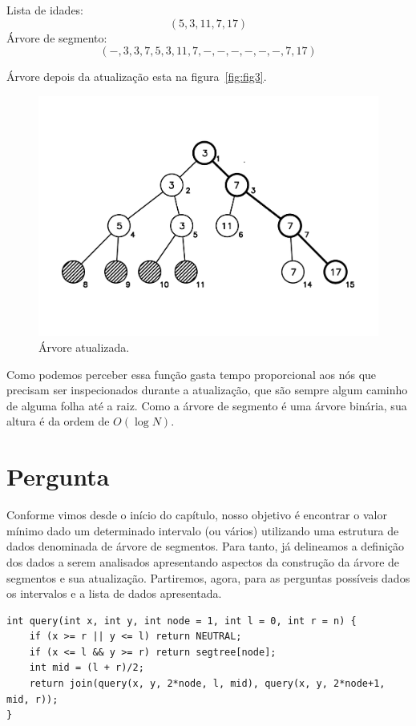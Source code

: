 Lista de idades: $$(5, 3, 11, 7, 17)$$
Árvore de segmento: $$(-, 3, 3, 7, 5, 3, 11, 7, -, -, -, -, -, -, 7, 17)$$

Árvore depois da atualização esta na figura~\ref{fig:fig3}.
\begin{figure}[htb]
\includegraphics[width=18cm]{figuras/fig3.pdf}
\caption{\label{fig:fig}Árvore atualizada.}
\end{figure}

Como podemos perceber essa função gasta tempo proporcional aos nós que precisam ser inspecionados durante a atualização, que são sempre algum caminho de alguma folha até a raiz. Como a árvore de segmento é uma árvore binária, sua altura é da ordem de $O(\log N)$.

\section{Pergunta}
Conforme vimos desde o início do capítulo, nosso objetivo é encontrar o valor mínimo dado um determinado intervalo (ou vários) utilizando uma estrutura de dados denominada de árvore de segmentos.
Para tanto, já delineamos a definição dos dados a serem analisados apresentando aspectos da construção da árvore de segmentos e sua atualização.
Partiremos, agora, para as perguntas possíveis dados os intervalos e a lista de dados apresentada.

\begin{lstlisting}
int query(int x, int y, int node = 1, int l = 0, int r = n) {
    if (x >= r || y <= l) return NEUTRAL;
    if (x <= l && y >= r) return segtree[node];
    int mid = (l + r)/2;
    return join(query(x, y, 2*node, l, mid), query(x, y, 2*node+1, mid, r));
}
\end{lstlisting}

